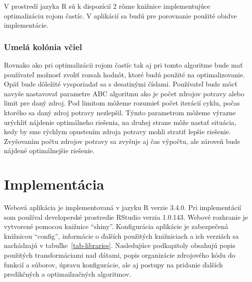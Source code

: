 \documentclass[a4paper,slovak,12pt,appendix]{article}
\begin{document}
V prostredí jazyka R sú k dispozícií 2 rôzne knižnice implementujúce
optimalizáciu rojom častíc. V aplikácií sa budú pre porovnanie použité obidve
implementácie.

\subsubsection{Umelá kolónia včiel}
Rovnako ako pri optimalizácii rojom častíc tak aj pri tomto algoritme bude mať
používateľ možnosť zvoliť rozsah hodnôt, ktoré budú použité na optimalizovanie.
Opäť bude dôležité vysporiadať sa s desatinými číslami. Používateľ bude môcť
navyše nastavovať parametre ABC algoritmu ako je počet zdrojov potravy alebo
limit pre daný zdroj. Pod limitom môžeme rozumieť počet iterácií cyklu, počas
ktorého sa daný zdroj potravy nezlepšil. Týmto parametrom môžeme výrazne
urýchliť nájdenie optimálneho riešenia, na druhej strane môže nastať situácia,
kedy by sme rýchlym opustením zdroja potravy mohli stratiť lepšie riešenie.
Zvyšovaním počtu zdrojov potravy sa zvyšuje aj čas výpočtu, ale zároveň bude
nájdené optimálnejšie riešenie.


\newpage
\section{Implementácia}
\label{implementation}
Webová aplikácia je implementovaná v jazyku R verzie 3.4.0. Pri implementácií
som používal developerské prostredie RStudio verzia 1.0.143. Webové rozhranie je
vytvorené pomocou knižnice ``shiny''. Konfigurácia aplikácie je zabezpečená
knižnicou ``config'', informácie o ďalších použitých knižniciach a ich verziách
sa nachádzajú v tabuľke~\ref{tab-libraries}. Nasledujúce podkapitoly obsahujú
popis použitých transformáciami nad dátami, popis organizácie zdrojového kódu
do funkcií a súborov, úpravu konfigurácie, ale aj postupy na pridanie ďalších
predikčných a optimailzačných algoritmov.
\end{document}
